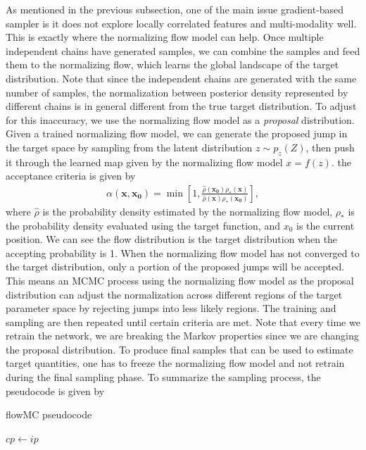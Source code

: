 \documentclass[twocolumn]{aastex631}
\begin{document}
As mentioned in the previous subsection, one of the main issue gradient-based
sampler is it does not explore locally correlated features and multi-modality well. This
is exactly where the normalizing flow model can help. Once multiple independent
chains have generated samples, we can combine the samples and feed them to the
normalizing flow, which learns the global landscape of the target
distribution. Note that since the independent chains are generated with the same
number of samples, the normalization between posterior density represented by
different chains is in general different from the true target distribution. To
adjust for this inaccuracy, we use the normalizing flow model as a
\textit{proposal} distribution. Given a trained normalizing flow model, we can
generate the proposed jump in the target space by sampling from the latent
distribution $z \sim p_z(Z)$, then push it through the learned map given by the
normalizing flow model $x=f(z)$. the acceptance criteria is given by
\begin{align}
    \alpha(\mathbf{x},\mathbf{x_0}) = \min \left[ 1, \frac{\hat{\rho}(\mathbf{x_0})\rho_*(\mathbf{x})}{\hat{\rho}(\mathbf{x})\rho_*(\mathbf{x_0})}\right],
\end{align}
where $\hat{\rho}$ is the probability density estimated by the normalizing flow
model, $\rho_*$ is the probability density evaluated using the target function,
and $x_0$ is the current position. We can see the flow distribution is the
target distribution when the accepting probability is 1. When the normalizing
flow model has not converged to the target distribution, only a portion of the
proposed jumps will be accepted. This means an MCMC process using the normalizing
flow model as the proposal distribution can adjust the normalization across
different regions of the target parameter space by rejecting jumps into less
likely regions. The training and sampling are then repeated until certain
criteria are met. Note that every time we retrain the network, we are breaking the
Markov properties since we are changing the proposal distribution. To produce
final samples that can be used to estimate target quantities, one has to freeze
the normalizing flow model and not retrain during the final sampling phase.
To summarize the sampling process, the pseudocode is given by

\begin{algorithm}
\caption{flowMC pseudocode}\label{alg:cap}
$cp \leftarrow ip$\\

\end{algorithm}
\end{document}
